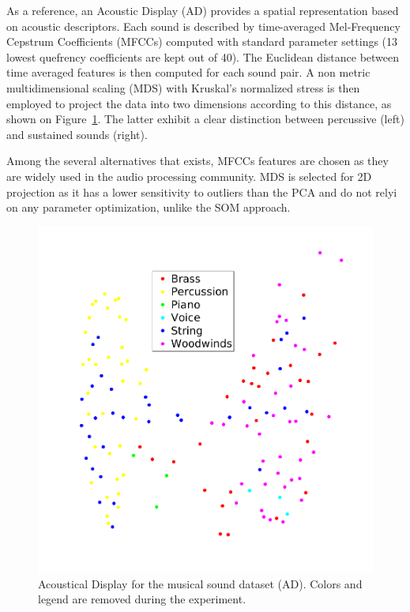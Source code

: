 \documentclass{aes2e}
\begin{document}
As a reference, an Acoustic Display (AD) provides a spatial representation based on acoustic descriptors. Each sound is described by time-averaged Mel-Frequency Cepstrum Coefficients (MFCCs) computed with standard parameter settings (13 lowest quefrency coefficients are kept out of 40). The Euclidean distance between time averaged features is then computed for each sound pair. A non metric multidimensional scaling (MDS) with Kruskal's normalized stress \cite{kruskal1964multidimensional} is then employed to project the data into two dimensions according to this distance, as shown on Figure~\ref{figXP3music}. The latter exhibit a clear distinction between percussive (left) and sustained sounds (right).


Among the several alternatives that exists, MFCCs features are chosen as they are widely used in the audio processing community. MDS is selected for 2D projection as it has a lower sensitivity to outliers than the PCA and do not relyi on any parameter optimization, unlike the SOM approach. 


\begin{figure}[t]
\begin{center}
\includegraphics[width=\columnwidth]{gfx/music_mds.png} 
\end{center}
\caption{\label{figXP3music} Acoustical Display for the musical sound dataset (AD). Colors and legend are removed during the experiment.}
\end{figure}
\end{document}
